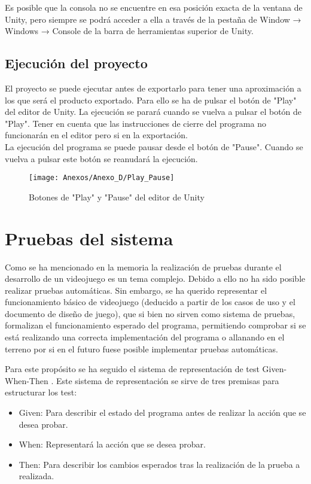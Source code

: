 Es posible que la consola no se encuentre en esa posición exacta de la ventana de Unity, pero siempre se podrá acceder a ella a través de la pestaña de Window → Windows → Console de la barra de herramientas superior de Unity.

\subsection{Ejecución del proyecto}
El proyecto se puede ejecutar antes de exportarlo para tener una aproximación a los que será el producto exportado. Para ello se ha de pulsar el botón de "Play" del editor de Unity. La ejecución se parará cuando se vuelva a pulsar el botón de "Play". Tener en cuenta que las instrucciones de cierre del programa no funcionarán en el editor pero si en la exportación.\\
La ejecución del programa se puede pausar desde el botón de "Pause". Cuando se vuelva a pulsar este botón se reanudará la ejecución.

\begin{figure}[h]
\centering
\texttt{[image: Anexos/Anexo\_D/Play\_Pause]}
\caption{Botones de "Play" y "Pause" del editor de Unity}
\end{figure}

\section{Pruebas del sistema}
Como se ha mencionado en la memoria la realización de pruebas durante el desarrollo de un videojuego es un tema complejo. Debido a ello no ha sido posible realizar pruebas automáticas. Sin embargo, se ha querido representar el funcionamiento básico de videojuego (deducido a partir de los casos de uso y el documento de diseño de juego), que si bien no sirven como sistema de pruebas, formalizan el funcionamiento esperado del programa, permitiendo comprobar si se está realizando una correcta implementación del programa o allanando en el terreno por si en el futuro fuese posible implementar pruebas automáticas.

Para este propósito se ha seguido el sistema de representación de test Given-When-Then \cite{GWT}. Este sistema de representación se sirve de tres premisas para estructurar los test:
\begin{itemize}
\item
Given: Para describir el estado del programa antes de realizar la acción que se desea probar.
\item
When: Representará la acción que se desea probar.
\item
Then: Para describir los cambios esperados tras la realización de la prueba a realizada.
\end{itemize}


